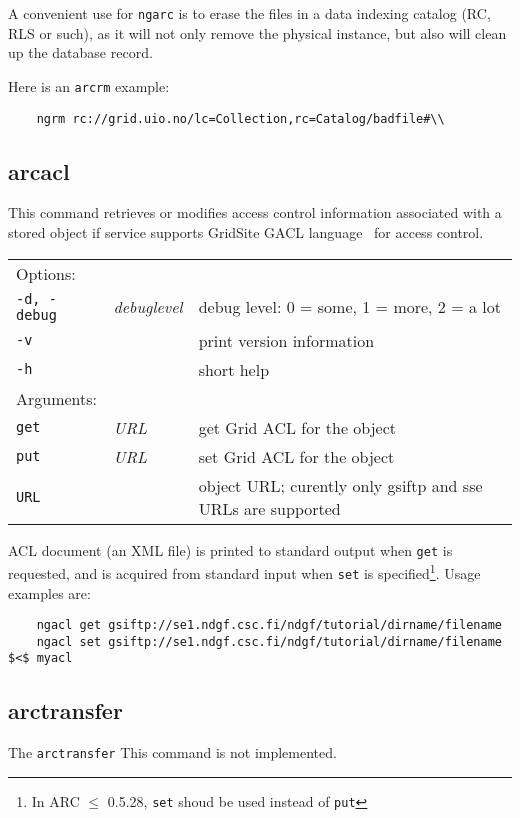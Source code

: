 \begin{framed}
   A convenient use for \texttt{ngarc} is to erase the files in a data
   indexing catalog (RC, RLS or such), as it will not only remove the
   physical instance, but also will clean up the database record.
\end{framed}

Here is an \texttt{arcrm} example:

\begin{verbatim}
    ngrm rc://grid.uio.no/lc=Collection,rc=Catalog/badfile#\\
\end{verbatim}

\subsection{arcacl}\label{sec:arcacl}

This command retrieves or modifies
access control information associated with a stored object if service
supports GridSite GACL language~\cite{gacl} for access control.
\hspace*{0.5cm}
\begin{shaded}
\end{shaded}
\begin{longtable}{llp{8cm}}
   Options:&&\\
    \texttt{-d, -debug} & \textit{debuglevel} &debug level: 0 = some, 1 = more, 2 = a lot \\
    \texttt{-v} && print version information\\
    \texttt{-h} && short help\\
   Arguments:&&\\
    \texttt{get} &\textit{URL}& get Grid ACL for the object\\
    \texttt{put} &\textit{URL}& set Grid ACL for the object\\
    \texttt{URL} && object URL; curently only gsiftp and sse URLs are supported\\
\end{longtable}

ACL document (an XML file) is printed to standard output when
\texttt{get} is requested, and is acquired from standard input when
\texttt{set} is specified\footnote{In ARC $\leq$ 0.5.28, \texttt{set}
  shoud be used instead of \texttt{put}}. Usage examples are:
\begin{verbatim}
    ngacl get gsiftp://se1.ndgf.csc.fi/ndgf/tutorial/dirname/filename
    ngacl set gsiftp://se1.ndgf.csc.fi/ndgf/tutorial/dirname/filename $<$ myacl
\end{verbatim}

\subsection{arctransfer}\label{sec:arctransfer}
The \texttt{arctransfer}
This command is not implemented.
